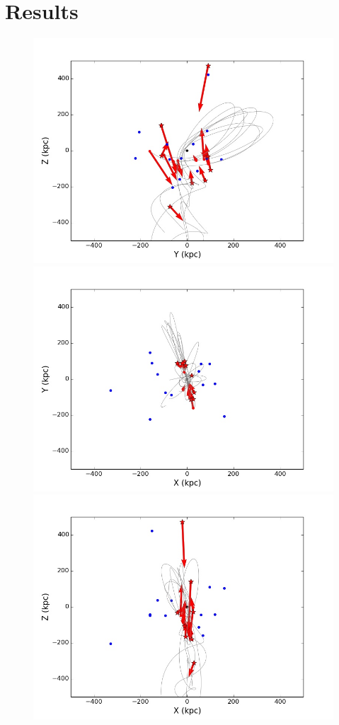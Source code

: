 \documentclass[useAMS,usenatbib]{mn2e}
\begin{document}
\section{Results}
\label{Results}
\begin{figure}
\centering
\includegraphics[width=\hsize]{yz_Fwd.jpg}\\
\includegraphics[width=0.5\hsize]{SnapshotSatellites_All_BeforeRotationM300_xy_All_Fwd_SSIMW_3000.jpg}\includegraphics[width=0.5\hsize]{SnapshotSatellites_All_BeforeRotationM300_xz_All_Fwd_SSIMW_3000.jpg}\\

\end{figure}
\end{document}
